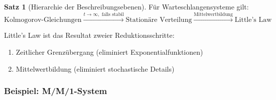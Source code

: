 ﻿\documentclass[a4paper,12pt]{scrreprt}
\theoremstyle{definition}
\newtheorem{satz}{Satz}[section]
\begin{document}
\begin{satz}[Hierarchie der Beschreibungsebenen]
	Für Warteschlangensysteme gilt:
	\begin{equation}
		\text{Kolmogorov-Gleichungen} \xrightarrow{t \to \infty, \text{ falls stabil}} \text{Stationäre Verteilung} \xrightarrow{\text{Mittelwertbildung}} \text{Little's Law}
	\end{equation}
	
	Little's Law ist das Resultat zweier Reduktionsschritte:
	\begin{enumerate}
		\item[-] Zeitlicher Grenzübergang (eliminiert Exponentialfunktionen)
		\item[-] Mittelwertbildung (eliminiert stochastische Details)
	\end{enumerate}
\end{satz}

\subsubsection{Beispiel: M/M/1-System}
\end{document}
